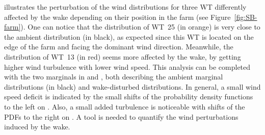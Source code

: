 illustrates the perturbation of the wind distributions for three WT differently affected by the wake depending on their position in the farm (see Figure~\ref{fig:SB-farm}). 
One can notice that the distribution of WT~25 (in orange) is very close to the ambient distribution (in black), as expected since this WT is located on the edge of the farm and facing the dominant wind direction. 
Meanwhile, the distribution of WT~13 (in red) seems more affected by the wake, by getting higher wind turbulence with lower wind speed. 
This analysis can be completed with the two marginals in  and , both describing the ambient marginal distributions (in black) and wake-disturbed distributions. 
In general, a small wind speed deficit is indicated by the small shifts of the probability density functions to the left on . 
Also, a small added turbulence is noticeable with shifts of the PDFs to the right on . 
A tool is needed to quantify the wind perturbations induced by the wake.

